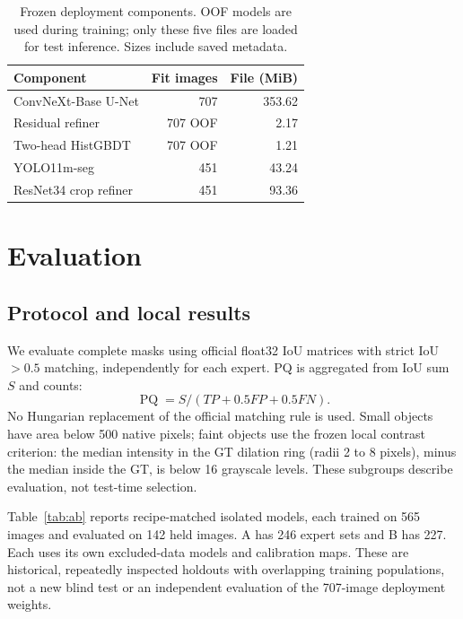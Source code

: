 \documentclass[sigconf]{acmart}
\begin{document}
\begin{table}[h]
\caption{Frozen deployment components. OOF models are used during training; only these five files are loaded for test inference. Sizes include saved metadata.}
\centering\small
\begin{tabular}{lrr}\toprule
Component & Fit images & File (MiB)\\\midrule
ConvNeXt-Base U-Net & 707 & 353.62\\
Residual refiner & 707 OOF & 2.17\\
Two-head HistGBDT & 707 OOF & 1.21\\
YOLO11m-seg & 451 & 43.24\\
ResNet34 crop refiner & 451 & 93.36\\\bottomrule
\end{tabular}
\end{table}

\clearpage
\section{Evaluation}\label{sec:evaluation}
\subsection{Protocol and local results}
We evaluate complete masks using official float32 IoU matrices with strict IoU $>0.5$ matching, independently for each expert. PQ is aggregated from IoU sum $S$ and counts:
\begin{equation}
\operatorname{PQ}=S/(TP+0.5FP+0.5FN).
\end{equation}
No Hungarian replacement of the official matching rule is used. Small objects have area below 500 native pixels; faint objects use the frozen local contrast criterion: the median intensity in the GT dilation ring (radii 2 to 8 pixels), minus the median inside the GT, is below 16 grayscale levels. These subgroups describe evaluation, not test-time selection.

Table~\ref{tab:ab} reports recipe-matched isolated models, each trained on 565 images and evaluated on 142 held images. A has 246 expert sets and B has 227. Each uses its own excluded-data models and calibration maps. These are historical, repeatedly inspected holdouts with overlapping training populations, not a new blind test or an independent evaluation of the 707-image deployment weights.
\end{document}
